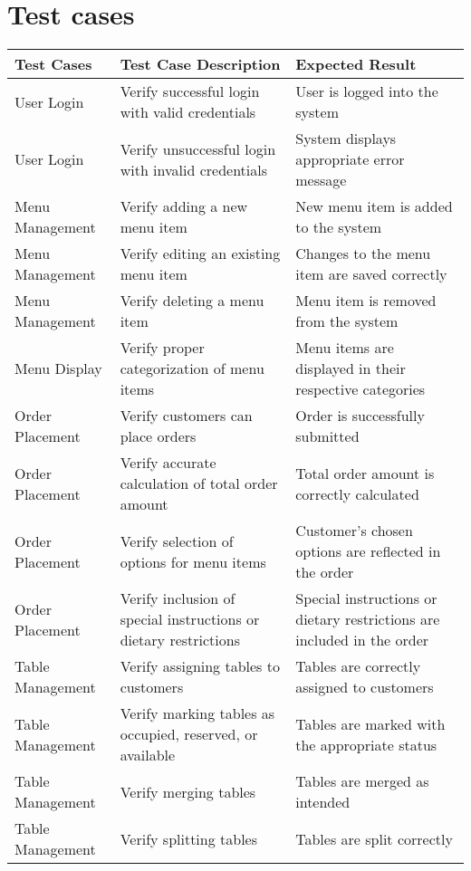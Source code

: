 \documentclass{article}
\begin{document}
\section{\textbf{Test cases}}
\begin{longtable}{|l|p{7cm}|p{5cm}|}
\hline
\textbf{Test Cases} & \textbf{Test Case Description} & \textbf{Expected Result} \\
\hline
\endhead %

User Login & Verify successful login with valid credentials & User is logged into the system \\
\hline
User Login & Verify unsuccessful login with invalid credentials & System displays appropriate error message \\
\hline
Menu Management & Verify adding a new menu item & New menu item is added to the system \\
\hline
Menu Management & Verify editing an existing menu item & Changes to the menu item are saved correctly \\
\hline
Menu Management & Verify deleting a menu item & Menu item is removed from the system \\
\hline
Menu Display & Verify proper categorization of menu items & Menu items are displayed in their respective categories \\
\hline
Order Placement & Verify customers can place orders & Order is successfully submitted \\
\hline
Order Placement & Verify accurate calculation of total order amount & Total order amount is correctly calculated \\
\hline
Order Placement & Verify selection of options for menu items & Customer's chosen options are reflected in the order \\
\hline
Order Placement & Verify inclusion of special instructions or dietary restrictions & Special instructions or dietary restrictions are included in the order \\
\hline
Table Management & Verify assigning tables to customers & Tables are correctly assigned to customers \\
\hline
Table Management & Verify marking tables as occupied, reserved, or available & Tables are marked with the appropriate status \\
\hline
Table Management & Verify merging tables & Tables are merged as intended \\
\hline
Table Management & Verify splitting tables & Tables are split correctly \\

\end{longtable}
\end{document}
